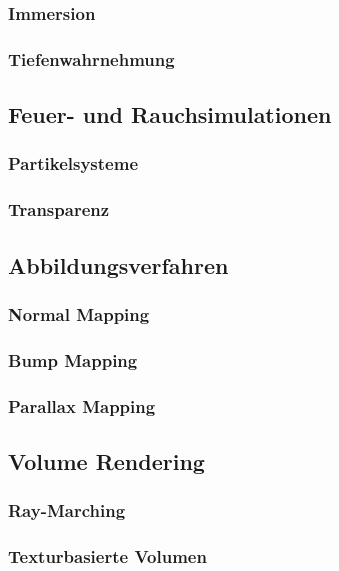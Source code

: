 


\subsubsection{Immersion}
\subsubsection{Tiefenwahrnehmung}


\subsection{Feuer- und Rauchsimulationen}
\subsubsection{Partikelsysteme}
\subsubsection{Transparenz}
\subsection{Abbildungsverfahren}
\subsubsection{Normal Mapping}
\subsubsection{Bump Mapping}
\subsubsection{Parallax Mapping}
\subsection{Volume Rendering}
\subsubsection{Ray-Marching}
\subsubsection{Texturbasierte Volumen}


\newpage
